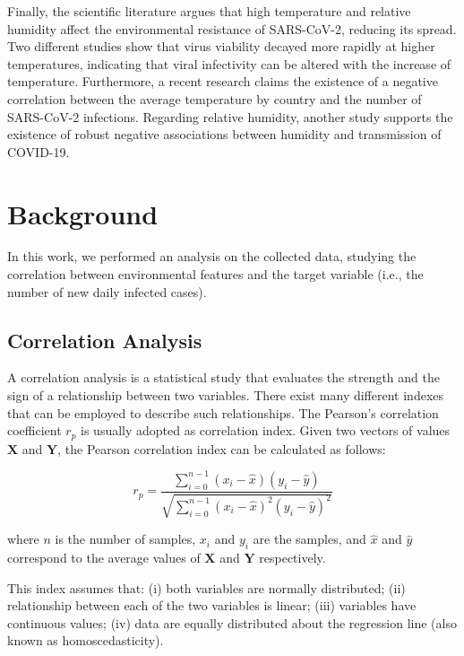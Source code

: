 \documentclass[review]{elsarticle}
\begin{document}
Finally, the scientific literature argues that high temperature and relative humidity affect the environmental resistance of SARS-CoV-2, reducing its spread. Two different studies \cite{magurano2020sars,chin2020stability} show that virus viability decayed more rapidly at higher temperatures, indicating that viral infectivity can be altered with the increase of temperature. Furthermore, a recent research \cite{sobral2020association} claims the existence of a negative correlation between the average temperature by country and the number of SARS-CoV-2 infections. Regarding relative humidity, another study \cite{wang2020high} supports the existence of robust negative associations between humidity and transmission of COVID-19.

\section{Background}
In this work, we performed an analysis on the collected data, studying the correlation between environmental features and the target variable (i.e., the number of new daily infected cases). %

\subsection{Correlation Analysis}
A correlation analysis \cite{FRANZESE2019706} is a statistical study that evaluates the strength and the sign of a relationship between two variables. There exist many different indexes that can be employed to describe such relationships.
The Pearson's correlation coefficient \cite{benesty2009pearson} $ r_p $ is usually adopted as correlation index. Given two vectors of values $ \mathbf{X} $ and $ \mathbf{Y} $, the Pearson correlation index can be calculated as follows:

\begin{displaymath}
	r_p = \frac{\displaystyle \sum_{i=0}^{n-1}(x_{i}-\hat{x})(y_{i}-\hat{y})}{\displaystyle \sqrt{ \sum_{i=0}^{n-1}(x_{i}-\hat{x})^{2}(y_{i}-\hat{y})^{2}}}
\end{displaymath}

where $ n $ is the number of samples, $x_{i}$ and $y_{i}$ are the samples,  and $ \hat{x} $ and $ \hat{y} $ correspond to the average values of $\mathbf{X}$ and $\mathbf{Y}$ respectively.

This index assumes that: 
(i) both variables are normally distributed;
(ii) relationship between each of the two variables is linear;
(iii) variables have continuous values;
(iv) data are equally distributed about the regression line (also known as homoscedasticity). 
\end{document}
